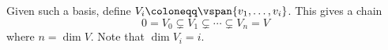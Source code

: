 Given such a basis, define $V_i\coloneqq\vspan{v_1, \ldots, v_i}$.
This gives a chain
\[ 0 = V_0 \subsetneq V_1 \subsetneq\cdots\subsetneq V_n = V \]
where $n = \dim V$. Note that $\dim V_i = i$.

